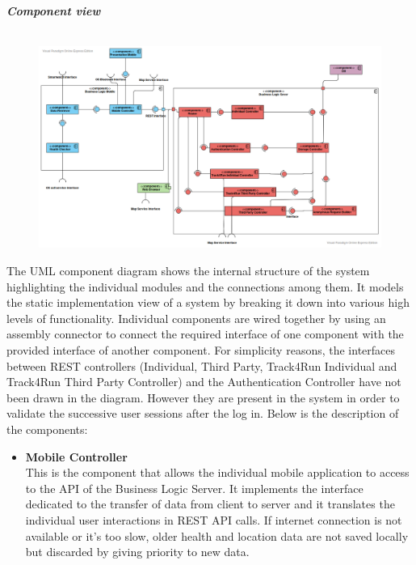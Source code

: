 \begin{legal}
		\item \textit{\textbf{Component view}}\\\\
		\begin{figure}[H]
		\includegraphics[width=\linewidth]{../images/design/ComponentDiagram.png}
		\end{figure}
		The UML component diagram shows the internal structure of the system highlighting the individual modules and the connections among them. It models the static implementation view of a system by breaking it down into various high levels of functionality.  Individual components are wired together by using an assembly connector to connect the required interface of one component with the provided interface of another component. For simplicity reasons, the interfaces between REST controllers (Individual, Third Party, Track4Run Individual and Track4Run Third Party Controller) and the Authentication Controller have not been drawn in the diagram. However they are present in the system in order to validate the successive user sessions after the log in. Below is the description of the components:\\
		\begin{itemize}
		\item{\textbf{Mobile Controller}\\
		This is the component that allows the individual mobile application to access to the API of the Business Logic Server. It implements the interface dedicated to the transfer of data from client to server and it translates the individual user interactions in REST API calls. If internet connection is not available or it's too slow, older health and location data are not saved locally but discarded by giving priority to new data.
				}\\

\end{itemize}
\end{legal}
